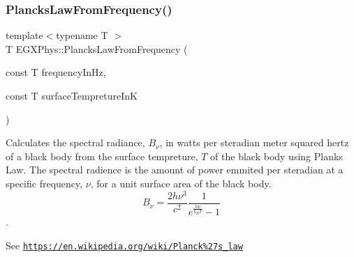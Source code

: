 \subsubsection{\texorpdfstring{Plancks\+Law\+From\+Frequency()}{PlancksLawFromFrequency()}}
{\footnotesize\ttfamily template$<$typename T $>$ \\
T E\+G\+X\+Phys\+::\+Plancks\+Law\+From\+Frequency (\begin{DoxyParamCaption}\item[{const T}]{frequency\+In\+Hz,  }\item[{const T}]{surface\+Tempreture\+InK }\end{DoxyParamCaption})}



Calculates the spectral radiance, $B_{\nu}$, in watts per steradian meter squared hertz of a black body from the surface tempreture, $T$ of the black body using Plank\textquotesingle{}s Law. The spectral radience is the amount of power emmited per steradian at a specific frequency, $\nu$, for a unit surface area of the black body. \[ B_{\nu} = \dfrac{2 h \nu^3}{c^2} \dfrac{1}{e^{\frac{h\nu}{k_B T}} - 1} \]. 

See \href{https://en.wikipedia.org/wiki/Planck%27s_law}{\tt https\+://en.\+wikipedia.\+org/wiki/\+Planck\%27s\+\_\+law}


